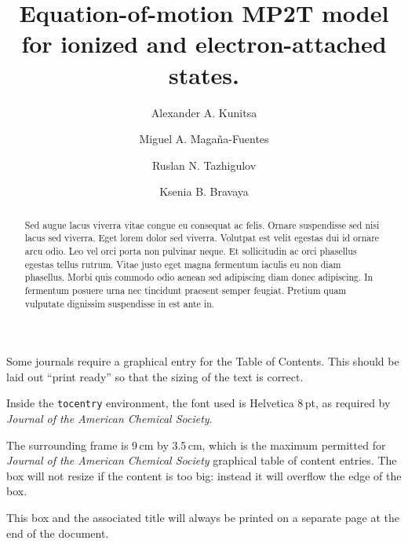 \documentclass[journal=jctc, manuscript=article]{achemso}
\author{Alexander A. Kunitsa}
\author{Miguel A. Magaña-Fuentes}
\author{Ruslan N. Tazhigulov}
\affiliation[Unknown University]
{Department of Chemistry, Unknown University, Unknown Town}
\author{Ksenia B. Bravaya}
\affiliation[BigPharma]
{Lead Discovery, BigPharma, Big Town, USA}
\affiliation[Unknown University]
{Department of Chemistry, Unknown University, Unknown Town}
\title[An \textsf{achemso} demo]
  {Equation-of-motion MP2T model for ionized and electron-attached states.}
\begin{document}
\begin{tocentry}

Some journals require a graphical entry for the Table of Contents.
This should be laid out ``print ready'' so that the sizing of the
text is correct.

Inside the \texttt{tocentry} environment, the font used is Helvetica
8\,pt, as required by \emph{Journal of the American Chemical
Society}.

The surrounding frame is 9\,cm by 3.5\,cm, which is the maximum
permitted for  \emph{Journal of the American Chemical Society}
graphical table of content entries. The box will not resize if the
content is too big: instead it will overflow the edge of the box.

This box and the associated title will always be printed on a
separate page at the end of the document.

\end{tocentry}

\begin{abstract}
Sed augue lacus viverra vitae congue eu consequat ac felis. Ornare suspendisse sed nisi lacus sed viverra. Eget lorem dolor sed viverra. Volutpat est velit egestas dui id ornare arcu odio. Leo vel orci porta non pulvinar neque. Et sollicitudin ac orci phasellus egestas tellus rutrum. Vitae justo eget magna fermentum iaculis eu non diam phasellus. Morbi quis commodo odio aenean sed adipiscing diam donec adipiscing. In fermentum posuere urna nec tincidunt praesent semper feugiat. Pretium quam vulputate dignissim suspendisse in est ante in.
\end{abstract}



\end{document}
